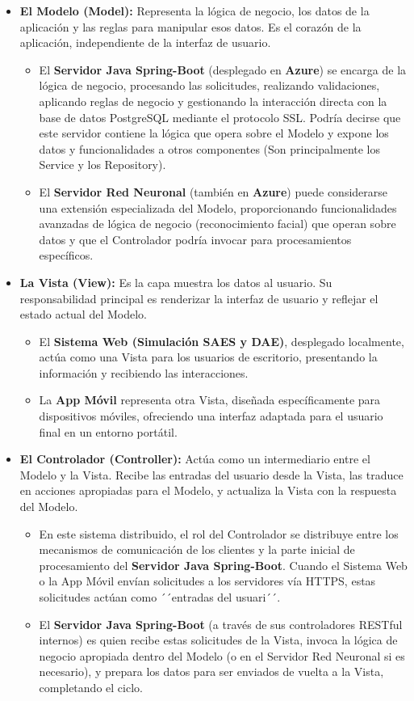 \begin{itemize}
	\item \textbf{El Modelo (Model):} Representa la lógica de negocio, los datos de la aplicación y las reglas para manipular esos datos. Es el corazón de la aplicación, independiente de la interfaz de usuario.
	\begin{itemize}
		\item El \textbf{Servidor Java Spring-Boot} (desplegado en \textbf{Azure}) se encarga de la lógica de negocio, procesando las solicitudes, realizando validaciones, aplicando reglas de negocio y gestionando la interacción directa con la base de datos PostgreSQL mediante el protocolo SSL. Podría decirse que este servidor contiene la lógica que opera sobre el Modelo y expone los datos y funcionalidades a otros componentes (Son principalmente los Service y los Repository).
		\item El \textbf{Servidor Red Neuronal} (también en \textbf{Azure}) puede considerarse una extensión especializada del Modelo, proporcionando funcionalidades avanzadas de lógica de negocio (reconocimiento facial) que operan sobre datos y que el Controlador podría invocar para procesamientos específicos.
	\end{itemize}
	
	\item \textbf{La Vista (View):} Es la capa muestra los datos al usuario. Su responsabilidad principal es renderizar la interfaz de usuario y reflejar el estado actual del Modelo.
	\begin{itemize}
		\item El \textbf{Sistema Web (Simulación SAES y DAE)}, desplegado localmente, actúa como una Vista para los usuarios de escritorio, presentando la información y recibiendo las interacciones.
		\item La \textbf{App Móvil} representa otra Vista, diseñada específicamente para dispositivos móviles, ofreciendo una interfaz adaptada para el usuario final en un entorno portátil.
	\end{itemize}
	
	\item \textbf{El Controlador (Controller):} Actúa como un intermediario entre el Modelo y la Vista. Recibe las entradas del usuario desde la Vista, las traduce en acciones apropiadas para el Modelo, y actualiza la Vista con la respuesta del Modelo.
	\begin{itemize}
		\item En este sistema distribuido, el rol del Controlador se distribuye entre los mecanismos de comunicación de los clientes y la parte inicial de procesamiento del \textbf{Servidor Java Spring-Boot}. Cuando el Sistema Web o la App Móvil envían solicitudes a los servidores vía HTTPS, estas solicitudes actúan como ´´entradas del usuari´´.
		\item El \textbf{Servidor Java Spring-Boot} (a través de sus controladores RESTful internos) es quien recibe estas solicitudes de la Vista, invoca la lógica de negocio apropiada dentro del Modelo (o en el Servidor Red Neuronal si es necesario), y prepara los datos para ser enviados de vuelta a la Vista, completando el ciclo.
	\end{itemize}
\end{itemize}
